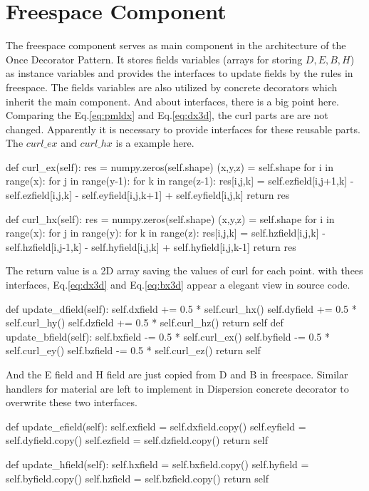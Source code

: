 \section{Freespace Component}
The freespace component serves as main component in the architecture of the Once Decorator Pattern. It stores fields
variables (arrays for storing $D, E, B, H$) as instance variables and provides the interfaces to update fields by the
rules in freespace. The fields variables are also utilized by concrete decorators which inherit the main component. And
about interfaces, there is a big point here. Comparing the Eq.\ref{eq:pmldx} and Eq.\ref{eq:dx3d}, the curl parts are
are not changed. Apparently it is necessary to provide interfaces for these reusable parts. The $curl\_ex$ and
$curl\_hx$ is a example here.
\begin{code}
    def curl_ex(self):
        res = numpy.zeros(self.shape)
        (x,y,z) = self.shape
        for i in range(x):
            for j in range(y-1):
                for k in range(z-1):
                    res[i,j,k] = self.ezfield[i,j+1,k] - self.ezfield[i,j,k] 
                               - self.eyfield[i,j,k+1] + self.eyfield[i,j,k]
        return res

    def curl_hx(self):
        res = numpy.zeros(self.shape)
        (x,y,z) = self.shape
        for i in range(x):
            for j in range(y):
                for k in range(z):
                    res[i,j,k] = self.hzfield[i,j,k] - self.hzfield[i,j-1,k] 
                               - self.hyfield[i,j,k] + self.hyfield[i,j,k-1]
        return res
\end{code}
The return value is a 2D array saving the values of curl for each point. with thees interfaces, Eq.\ref{eq:dx3d} and
Eq.\ref{eq:bx3d} appear a elegant view in source code.
\begin{code}
    def update_dfield(self):
        self.dxfield += 0.5 * self.curl_hx()
        self.dyfield += 0.5 * self.curl_hy()
        self.dzfield += 0.5 * self.curl_hz()
        return self
    def update_bfield(self):
        self.bxfield -= 0.5 * self.curl_ex()
        self.byfield -= 0.5 * self.curl_ey()
        self.bzfield -= 0.5 * self.curl_ez()
        return self
\end{code}
And the E field and H field are just copied from D and B in freespace. Similar handlers for material are left to
implement in Dispersion concrete decorator to overwrite these two interfaces.
\begin{code}
    def update_efield(self):
        self.exfield = self.dxfield.copy()
        self.eyfield = self.dyfield.copy()
        self.ezfield = self.dzfield.copy()
        return self

    def update_hfield(self):
        self.hxfield = self.bxfield.copy()
        self.hyfield = self.byfield.copy()
        self.hzfield = self.bzfield.copy()
        return self
\end{code}


